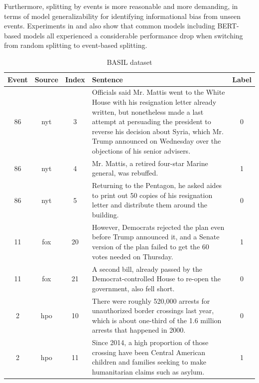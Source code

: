 Furthermore, splitting by events is more reasonable and more demanding, in terms of model generalizability for identifying informational bias from unseen events. Experiments in \citet{van-den-berg-markert-2020-context} and \citet{chen-etal-2020-detecting} also show that common models including BERT-based models all experienced a considerable performance drop when switching from random splitting to event-based splitting.

\begin{table}[th]
    \centering
    \begin{tabular}{cccp{12cm}c}
        \toprule
        \textbf{Event} & \textbf{Source} & \textbf{Index} & \textbf{Sentence} & \textbf{Label} \\
        \midrule
        86 & nyt & 3 &  Officials said Mr. Mattis went to the White House with his resignation letter already written, but nonetheless made a last attempt at persuading the president to reverse his decision about Syria, which Mr. Trump announced on Wednesday over the objections of his senior advisers. & 0\\
        \hline
        86 & nyt & 4 &  Mr. Mattis, a retired four-star Marine general, was rebuffed. & 1\\
        \hline
        86 & nyt & 5 &  Returning to the Pentagon, he asked aides to print out 50 copies of his resignation letter and distribute them around the building. & 0 \\
        \midrule
        11 & fox & 20 & However, Democrats rejected the plan even before Trump announced it, and a Senate version of the plan failed to get the 60 votes needed on Thursday.  & 1\\
\hline
        11 & fox & 21 & A second bill, already passed by the Democrat-controlled House to re-open the government, also fell short. & 0\\
        \midrule
        2 & hpo & 10 & There were roughly 520,000 arrests for unauthorized border crossings last year, which is about one-third of the 1.6 million arrests that happened in 2000. & 0\\
        \hline
        2 & hpo & 11 &Since 2014, a high proportion of those crossing have been Central American children and families seeking to make humanitarian claims such as asylum. & 1\\
        \bottomrule
    \end{tabular}
    \caption{BASIL dataset}
    \label{tab:basil}
\end{table}


